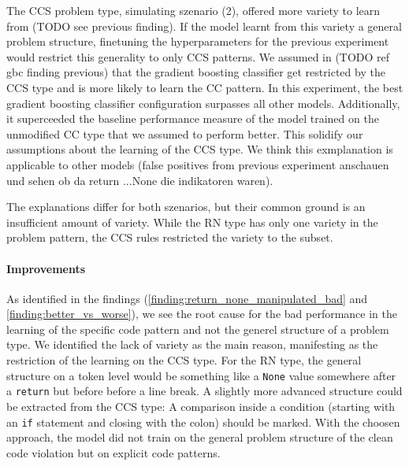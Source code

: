 The CCS problem type, simulating szenario (2), offered more variety to learn from (TODO see previous finding). If the model learnt from this variety a general problem structure, finetuning the hyperparameters for the previous experiment would restrict this generality to only CCS patterns. We assumed in (TODO ref gbc finding previous) that the gradient boosting classifier get restricted by the CCS type and is more likely to learn the CC pattern. In this experiment, the best gradient boosting classifier configuration surpasses all other models. Additionally, it superceeded the baseline performance measure of the model trained on the unmodified CC type that we assumed to perform better. This solidify our assumptions about the learning of the CCS type. We think this exmplanation is applicable to other models (false positives from previous experiment anschauen und sehen ob da return ...None die indikatoren waren).

The explanations differ for both szenarios, but their common ground is an insufficient amount of variety. While the RN type has only one variety in the problem pattern, the CCS rules restricted the variety to the subset.

\paragraph{Improvements}
As identified in the findings (\ref{finding:return_none_manipulated_bad} and \ref{finding:better_vs_worse}), we see the root cause for the bad performance in the learning of the specific code pattern and not the generel structure of a problem type. We identified the lack of variety as the main reason, manifesting as the restriction of the learning on the CCS type. For the RN type, the general structure on a token level would be something like a \texttt{None} value somewhere after a \texttt{return} but before before a line break. A slightly more advanced structure could be extracted from the CCS type: A comparison inside a condition (starting with an \texttt{if} statement and closing with the colon) should be marked. With the choosen approach, the model did not train on the general problem structure of the clean code violation but on explicit code patterns. 

